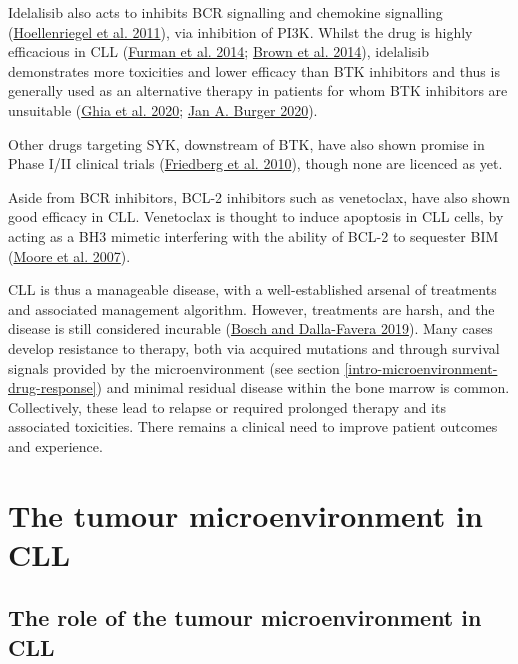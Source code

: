 \documentclass[11pt, a4paper, twosided]{book}
\begin{document}
Idelalisib also acts to inhibits BCR signalling and chemokine signalling (\protect\hyperlink{ref-Hoellenriegel2011}{Hoellenriegel et al. 2011}), via inhibition of PI3K. Whilst the drug is highly efficacious in CLL (\protect\hyperlink{ref-Furman2014}{Furman et al. 2014}; \protect\hyperlink{ref-Brown2014}{Brown et al. 2014}), idelalisib demonstrates more toxicities and lower efficacy than BTK inhibitors and thus is generally used as an alternative therapy in patients for whom BTK inhibitors are unsuitable (\protect\hyperlink{ref-Ghia2020}{Ghia et al. 2020}; \protect\hyperlink{ref-Burger2020}{Jan A. Burger 2020}).

Other drugs targeting SYK, downstream of BTK, have also shown promise in Phase I/II clinical trials (\protect\hyperlink{ref-Friedberg2010}{Friedberg et al. 2010}), though none are licenced as yet.

Aside from BCR inhibitors, BCL-2 inhibitors such as venetoclax, have also shown good efficacy in CLL. Venetoclax is thought to induce apoptosis in CLL cells, by acting as a BH3 mimetic interfering with the ability of BCL-2 to sequester BIM (\protect\hyperlink{ref-Moore2007}{Moore et al. 2007}).

CLL is thus a manageable disease, with a well-established arsenal of treatments and associated management algorithm. However, treatments are harsh, and the disease is still considered incurable (\protect\hyperlink{ref-Bosch2019}{Bosch and Dalla-Favera 2019}). Many cases develop resistance to therapy, both via acquired mutations and through survival signals provided by the microenvironment (see section \ref{intro-microenvironment-drug-response}) and minimal residual disease within the bone marrow is common. Collectively, these lead to relapse or required prolonged therapy and its associated toxicities. There remains a clinical need to improve patient outcomes and experience.

\hypertarget{intro-tumour-microenvironment}{%
\section{The tumour microenvironment in CLL}\label{intro-tumour-microenvironment}}

\hypertarget{intro-tumour-microenvironment-role}{%
\subsection{The role of the tumour microenvironment in CLL}\label{intro-tumour-microenvironment-role}}
\end{document}
